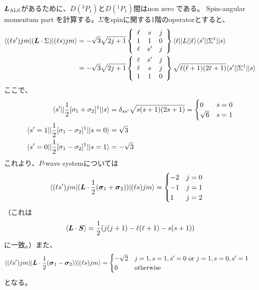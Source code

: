 \documentclass[a4j]{jarticle}
\def\bra{\langle}
\def\ket{\rangle}
\newcommand{\xbld}[1]{\mbox{\boldmath $#1$}}
\def\vecL{{\xbld{L}}}
\def\vecsig{{\xbld{\sigma}}}
\def\half#1{\text{${#1\over 2}$}}
\def\Lals{{\vecL_\text{ALS}}}
\begin{document}
$\Lals$があるために、$D(^3P_1)$と$D(^1P_1)$間はnon zero である。
Spin-angular momentum part を計算する。$\Sigma$をspinに関する1階のoperatorとすると、
\begin{align}
\bra (\ell s')jm|(\vecL\cdot \Sigma)|(\ell s)jm\ket
&= -\sqrt{3} \sqrt{2j+1}
\left\{\begin{array}{ccc}\ell &s& j\\1&1&0\\\ell&s'&j\\\end{array}\right\}
\bra\ell||L||\ell\ket\bra s'||\Sigma^1||s\ket
\\
&= -\sqrt{3} \sqrt{2j+1}
\left\{\begin{array}{ccc}\ell&s'&j\\\ell &s& j\\1&1&0\\\end{array}\right\}
\sqrt{\ell(\ell+1)(2\ell+1)}\bra s'||\Sigma^1||s\ket
\end{align}
ここで、
\begin{align}
\bra s'||\half1 [\sigma_1+\sigma_2]^1||s\ket
&= \delta_{ss'}\sqrt{s(s+1)(2s+1)}
=\begin{cases}
0 & s=0\\ \sqrt{6} &s=1
\end{cases}
\\
\bra s'=1||\half1 [\sigma_1-\sigma_2]^1||s=0\ket
&= \sqrt{3}
\\
\bra s'=0||\half1 [\sigma_1-\sigma_2]^1||s=1\ket
&= -\sqrt{3}
\end{align}
これより、$P$-wave systemについては
\begin{align}
\bra (\ell s')jm|(\vecL\cdot \half1 (\vecsig_1+\vecsig_2))|(\ell s)jm\ket
& =\begin{cases}
-2 & j=0\\ 
-1 & j=1\\ 
1 & j=2
\end{cases}
\end{align}
（これは
\[\bra \vecL\cdot\xbld{S} \ket=\half1(j(j+1)-\ell(\ell+1)-s(s+1))
\]
に一致。）また、
\begin{align}
\bra (\ell s')jm|(\vecL\cdot \half1 (\vecsig_1-\vecsig_2))|(\ell s)jm\ket
& =\begin{cases}
-\sqrt{2} & j=1, s=1, s'=0 \text{ or } j=1, s=0, s'=1\\ 
0 & \text{otherwise}
\end{cases}
\end{align}
となる。
\end{document}

